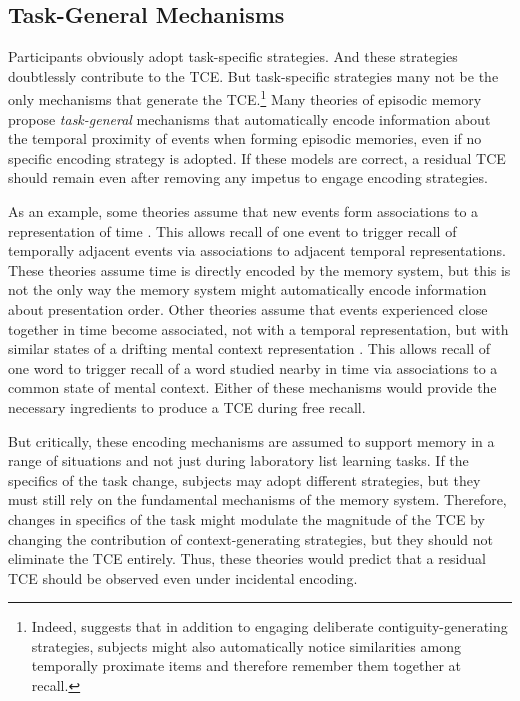 \documentclass[man,natbib,floatsintext]{apa6} %
\begin{document}
\subsection{Task-General Mechanisms}
Participants obviously adopt task-specific strategies. And these strategies doubtlessly contribute to the TCE. But task-specific strategies many not be the only mechanisms that generate the TCE.\footnote{Indeed, \citet{Hint16} suggests that in addition to engaging deliberate contiguity-generating strategies, subjects might also automatically notice similarities among temporally proximate items and therefore remember them together at recall.} Many theories of episodic memory propose \emph{task-general} mechanisms that automatically encode information about the temporal proximity of events when forming episodic memories, even if no specific encoding strategy is adopted. If these models are correct, a residual TCE should remain even after removing any impetus to engage encoding strategies.

As an example, some theories assume that new events form associations to a representation of time \citep{HowaEtal14a,BrowEtal07}. This allows recall of one event to trigger recall of temporally adjacent events via associations to adjacent temporal representations. These theories assume time is directly encoded by the memory system, but this is not the only way the memory system might automatically encode information about presentation order. Other theories assume that events experienced close together in time become associated, not with a temporal representation, but with similar states of a drifting mental context representation \citep{PolyEtal09,LohnEtal14,McGe32}. This allows recall of one word to trigger recall of a word studied nearby in time via associations to a common state of mental context. Either of these mechanisms would provide the necessary ingredients to produce a TCE during free recall. 

But critically, these encoding mechanisms are assumed to support memory in a range of situations and not just during laboratory list learning tasks. If the specifics of the task change, subjects may adopt different strategies, but they must still rely on the fundamental mechanisms of the memory system. Therefore, changes in specifics of the task might modulate the magnitude of the TCE by changing the contribution of context-generating strategies, but they should not eliminate the TCE entirely. Thus, these theories would predict that a residual TCE should be observed even under incidental encoding.
\end{document}
